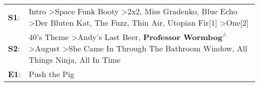 \begin{supertabular}{p{0.03\textwidth}p{0.92\textwidth}}
 \textbf{S1}:  &  Intro\textsuperscript{} \textgreater \enspace Space Funk Booty\textsuperscript{} \textgreater \enspace 2x2\textsuperscript{}, \enspace Miss Gradenko\textsuperscript{}, \enspace Blue Echo\textsuperscript{} \textgreater \enspace Der Bluten Kat\textsuperscript{}, \enspace The Fuzz\textsuperscript{}, \enspace Thin Air\textsuperscript{}, \enspace Utopian Fir[1]\textsuperscript{} \textgreater \enspace One[2]\textsuperscript{}  \enspace  \\
 \textbf{S2}:  &                                                                 40's Theme\textsuperscript{} \textgreater \enspace Andy's Last Beer\textsuperscript{}, \enspace \textbf{Professor Wormbog\textsuperscript{$\wedge$}} \textgreater \enspace August\textsuperscript{} \textgreater \enspace She Came In Through The Bathroom Window\textsuperscript{}, \enspace All Things Ninja\textsuperscript{}, \enspace All In Time\textsuperscript{}  \enspace  \\
 \textbf{E1}:  &                                                                                                                                                                                                                                                                                                                                                                                                           Push the Pig\textsuperscript{}  \enspace  \\
\end{supertabular}
